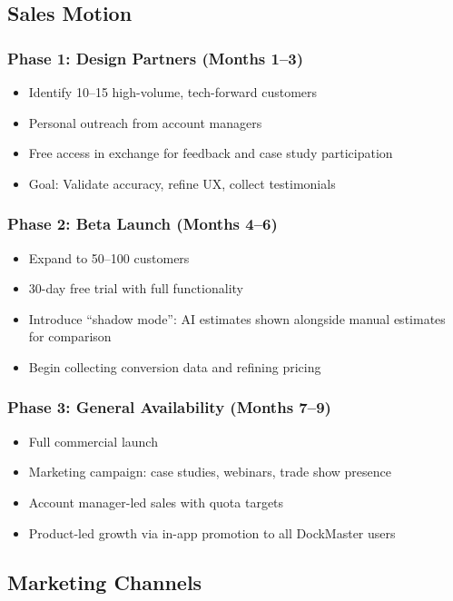 \documentclass[11pt,a4paper]{article}
\begin{document}
\subsection{Sales Motion}

\subsubsection*{Phase 1: Design Partners (Months 1--3)}
\begin{itemize}[leftmargin=*]
    \item Identify 10--15 high-volume, tech-forward customers
    \item Personal outreach from account managers
    \item Free access in exchange for feedback and case study participation
    \item Goal: Validate accuracy, refine UX, collect testimonials
\end{itemize}

\subsubsection*{Phase 2: Beta Launch (Months 4--6)}
\begin{itemize}[leftmargin=*]
    \item Expand to 50--100 customers
    \item 30-day free trial with full functionality
    \item Introduce ``shadow mode'': AI estimates shown alongside manual estimates for comparison
    \item Begin collecting conversion data and refining pricing
\end{itemize}

\subsubsection*{Phase 3: General Availability (Months 7--9)}
\begin{itemize}[leftmargin=*]
    \item Full commercial launch
    \item Marketing campaign: case studies, webinars, trade show presence
    \item Account manager-led sales with quota targets
    \item Product-led growth via in-app promotion to all DockMaster users
\end{itemize}

\subsection{Marketing Channels}
\end{document}
